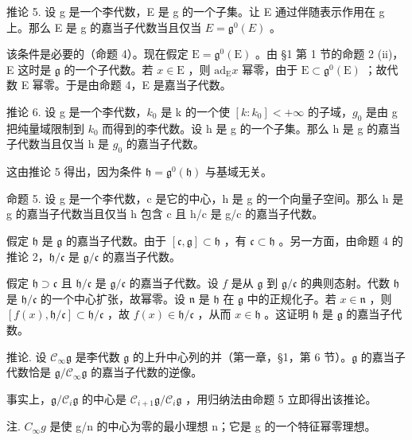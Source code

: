推论 5. 设 g 是一个李代数，E 是 g 的一个子集。让 E 通过伴随表示作用在 g 上。那么 E 是 g 的嘉当子代数当且仅当 \(E = \mathfrak{g}^{0}(E)\) 。

该条件是必要的（命题 4）。现在假定 \(\mathrm{E} = \mathfrak{g}^0 (\mathrm{E})\) 。由 §1 第 1 节的命题 2 (ii)，E 这时是 \(\mathfrak{g}\) 的一个子代数。若 \(x\in \mathrm{E}\) ，则 \(\mathrm{ad}_{\mathrm{E}}x\) 幂零，由于 \(\mathrm{E}\subset \mathfrak{g}^0 (\mathrm{E})\) ；故代数 E 幂零。于是由命题 4，E 是嘉当子代数。

推论 6. 设 g 是一个李代数，\(k_{0}\) 是 k 的一个使 \([k:k_{0}]<+\infty\) 的子域，\(g_{0}\) 是由 g 把纯量域限制到 \(k_{0}\) 而得到的李代数。设 h 是 g 的一个子集。那么 h 是 g 的嘉当子代数当且仅当 h 是 \(g_{0}\) 的嘉当子代数。

这由推论 5 得出，因为条件 \(\mathfrak{h} = \mathfrak{g}^0 (\mathfrak{h})\) 与基域无关。

命题 5. 设 g 是一个李代数，c 是它的中心，h 是 g 的一个向量子空间。那么 h 是 g 的嘉当子代数当且仅当 h 包含 c 且 h/c 是 g/c 的嘉当子代数。

假定 \(\mathfrak{h}\) 是 \(\mathfrak{g}\) 的嘉当子代数。由于 \([\mathfrak{c},\mathfrak{g}]\subset \mathfrak{h}\) ，有 \(\mathfrak{c}\subset \mathfrak{h}\) 。另一方面，由命题 4 的推论 2，\(\mathfrak{h} / \mathfrak{c}\) 是 \(\mathfrak{g} / \mathfrak{c}\) 的嘉当子代数。

假定 \(\mathfrak{h} \supset \mathfrak{c}\) 且 \(\mathfrak{h} / \mathfrak{c}\) 是 \(\mathfrak{g} / \mathfrak{c}\) 的嘉当子代数。设 \(f\) 是从 \(\mathfrak{g}\) 到 \(\mathfrak{g} / \mathfrak{c}\) 的典则态射。代数 \(\mathfrak{h}\) 是 \(\mathfrak{h} / \mathfrak{c}\) 的一个中心扩张，故幂零。设 \(\mathfrak{n}\) 是 \(\mathfrak{h}\) 在 \(\mathfrak{g}\) 中的正规化子。若 \(x \in \mathfrak{n}\) ，则 \([f(x), \mathfrak{h} / \mathfrak{c}] \subset \mathfrak{h} / \mathfrak{c}\) ，故 \(f(x) \in \mathfrak{h} / \mathfrak{c}\) ，从而 \(x \in \mathfrak{h}\) 。这证明 \(\mathfrak{h}\) 是 \(\mathfrak{g}\) 的嘉当子代数。

推论. 设 \(\mathcal{C}_{\infty}\mathfrak{g}\) 是李代数 \(\mathfrak{g}\) 的上升中心列的并（第一章，§1，第 6 节）。\(\mathfrak{g}\) 的嘉当子代数恰是 \(\mathfrak{g}/\mathcal{C}_{\infty}\mathfrak{g}\) 的嘉当子代数的逆像。

事实上，\(\mathfrak{g} / \mathcal{C}_i\mathfrak{g}\) 的中心是 \(\mathcal{C}_{i + 1}\mathfrak{g} / \mathcal{C}_i\mathfrak{g}\) ，用归纳法由命题 5 立即得出该推论。

注. \(C_{\infty}g\) 是使 g/n 的中心为零的最小理想 n；它是 g 的一个特征幂零理想。

